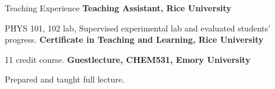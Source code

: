 \begin{rubric}{Teaching Experience}
%
\entry*[\hspace{1.05cm}2015]%
  \textbf{Teaching Assistant, Rice University}
  \par PHYS 101, 102 lab, Supervised experimental lab and evaluated students' progress.
\entry*[\hspace{1.05cm}2020]%
  \textbf{Certificate in Teaching and Learning, Rice University}
  \par 11 credit course.
\entry*[\hspace{1.05cm}2021]%
  \textbf{Guestlecture, CHEM531, Emory University}
  \par Prepared and taught full lecture.
\end{rubric}
